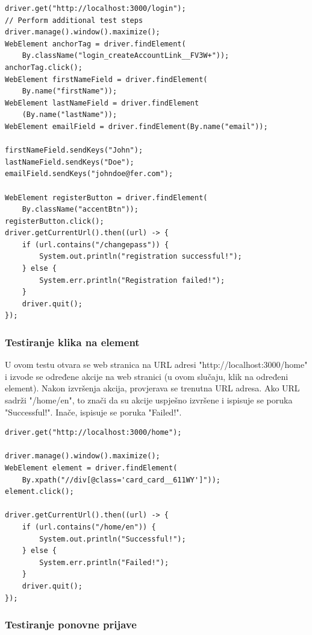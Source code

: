 			\begin{lstlisting}
driver.get("http://localhost:3000/login");
// Perform additional test steps
driver.manage().window().maximize();
WebElement anchorTag = driver.findElement(
	By.className("login_createAccountLink__FV3W+"));
anchorTag.click();
WebElement firstNameField = driver.findElement(
	By.name("firstName"));
WebElement lastNameField = driver.findElement
	(By.name("lastName"));
WebElement emailField = driver.findElement(By.name("email"));

firstNameField.sendKeys("John");
lastNameField.sendKeys("Doe");
emailField.sendKeys("johndoe@fer.com");

WebElement registerButton = driver.findElement(
	By.className("accentBtn"));
registerButton.click();
driver.getCurrentUrl().then((url) -> {
	if (url.contains("/changepass")) {
		System.out.println("registration successful!");
	} else {
		System.err.println("Registration failed!");
	}
	driver.quit();        
});
			\end{lstlisting}

			\subsubsection{Testiranje klika na element}

			U ovom testu otvara se web stranica na URL adresi "http://localhost:3000/home" i izvode se određene akcije na web stranici (u ovom slučaju, klik na određeni element). Nakon izvršenja akcija, provjerava se trenutna URL adresa. Ako URL sadrži "/home/en", to znači da su akcije uspješno izvršene i ispisuje se poruka "Successful!". Inače, ispisuje se poruka "Failed!".

			\begin{lstlisting}
driver.get("http://localhost:3000/home");

driver.manage().window().maximize();
WebElement element = driver.findElement(
	By.xpath("//div[@class='card_card__611WY']"));
element.click();

driver.getCurrentUrl().then((url) -> {
	if (url.contains("/home/en")) {
		System.out.println("Successful!");
	} else {
		System.err.println("Failed!");
	}
	driver.quit();
});
			\end{lstlisting}

			\subsubsection{Testiranje ponovne prijave}

